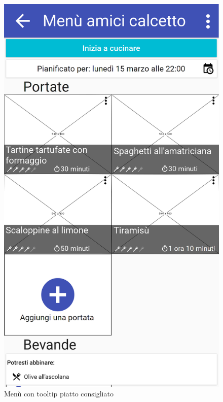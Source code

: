 \begin{figure}[H]
\begin{minipage}{.49\textwidth}
		\includegraphics[width=\textwidth]{img/wireframe/men_amici_calcetto_menu_contestuale_piatto.png}
		\caption{Menù con tooltip piatto consigliato}
	\end{minipage}
\end{figure}
